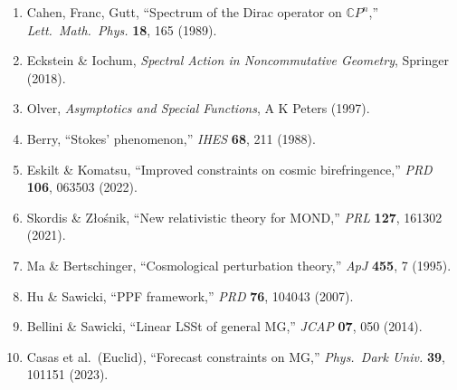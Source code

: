 \documentclass[11pt,a4paper]{article}
\newcommand{\CP}{\mathbb{C}P}
\begin{document}
\begin{enumerate}
\item Cahen, Franc, Gutt, ``Spectrum of the Dirac operator on $\CP^n$,'' \textit{Lett.\ Math.\ Phys.} \textbf{18}, 165 (1989).
\item Eckstein \& Iochum, \textit{Spectral Action in Noncommutative Geometry}, Springer (2018).
\item Olver, \textit{Asymptotics and Special Functions}, A K Peters (1997).
\item Berry, ``Stokes' phenomenon,'' \textit{IHES} \textbf{68}, 211 (1988).
\item Eskilt \& Komatsu, ``Improved constraints on cosmic birefringence,'' \textit{PRD} \textbf{106}, 063503 (2022).
\item Skordis \& Z\l{}o\'snik, ``New relativistic theory for MOND,'' \textit{PRL} \textbf{127}, 161302 (2021).
\item Ma \& Bertschinger, ``Cosmological perturbation theory,'' \textit{ApJ} \textbf{455}, 7 (1995).
\item Hu \& Sawicki, ``PPF framework,'' \textit{PRD} \textbf{76}, 104043 (2007).
\item Bellini \& Sawicki, ``Linear LSSt of general MG,'' \textit{JCAP} \textbf{07}, 050 (2014).
\item Casas et al.\ (Euclid), ``Forecast constraints on MG,'' \textit{Phys.\ Dark Univ.} \textbf{39}, 101151 (2023).
\end{enumerate}
\end{document}
